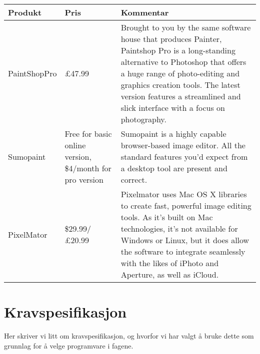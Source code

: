 \begin{center}
\begin{tabular}{ | m{4cm} | m{2cm}| m{8cm} | } 
\hline
\textbf{Produkt} & \textbf{Pris} & \textbf{Kommentar} \\
\hline

{\color{red} PaintShopPro } & £47.99 & Brought to you by the same software house that produces Painter, Paintshop Pro is a long-standing alternative to Photoshop that offers a huge range of photo-editing and graphics creation tools. The latest version features a streamlined and slick interface with a focus on photography.\\
\hline
{\color{red} Sumopaint } & Free for basic online version, \$4/month for pro version & Sumopaint is a highly capable browser-based image editor. All the standard features you'd expect from a desktop tool are present and correct.\\
\hline
{\color{red} PixelMator} & \$29.99/£20.99 & Pixelmator uses Mac OS X libraries to create fast, powerful image editing tools. As it's built on Mac technologies, it's not available for Windows or Linux, but it does allow the software to integrate seamlessly with the likes of iPhoto and Aperture, as well as iCloud.\\
\hline


\end{tabular}
\end{center}




\section{Kravspesifikasjon}
{ \color{red} Her skriver vi litt om kravspesifikasjon, og hvorfor vi har valgt å bruke dette som grunnlag for å velge programvare i fagene. }


